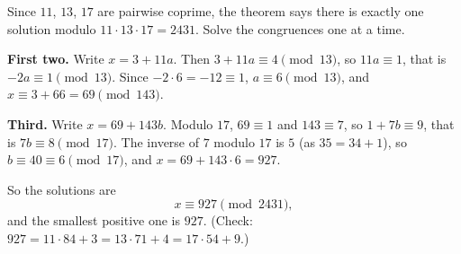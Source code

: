 Since $11$, $13$, $17$ are pairwise coprime, the theorem says there is exactly one solution modulo $11\cdot13\cdot17=2431$. Solve the congruences one at a time.

\textbf{First two.} Write $x=3+11a$. Then $3+11a\equiv4\pmod{13}$, so $11a\equiv1$, that is $-2a\equiv1\pmod{13}$. Since $-2\cdot6=-12\equiv1$, $a\equiv6\pmod{13}$, and $x\equiv3+66=69\pmod{143}$.

\textbf{Third.} Write $x=69+143b$. Modulo $17$, $69\equiv1$ and $143\equiv7$, so $1+7b\equiv9$, that is $7b\equiv8\pmod{17}$. The inverse of $7$ modulo $17$ is $5$ (as $35=34+1$), so $b\equiv40\equiv6\pmod{17}$, and $x=69+143\cdot6=927$.

So the solutions are
\[
\boxed{x\equiv927\pmod{2431}},
\]
and the smallest positive one is $927$. (Check: $927=11\cdot84+3=13\cdot71+4=17\cdot54+9$.)
